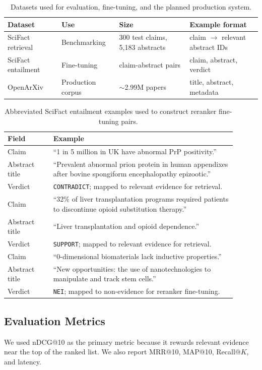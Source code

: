 \documentclass[11pt,a4paper]{article}
\begin{document}
\begin{table}[H]
\centering
\small
\begin{tabular}{llll}
\toprule
Dataset & Use & Size & Example format \\
\midrule
SciFact retrieval & Benchmarking & 300 test claims, 5,183 abstracts & claim $\rightarrow$ relevant abstract IDs \\
SciFact entailment & Fine-tuning & claim-abstract pairs & claim, abstract, verdict \\
OpenArXiv & Production corpus & $\sim$2.99M papers & title, abstract, metadata \\
\bottomrule
\end{tabular}
\caption{Datasets used for evaluation, fine-tuning, and the planned production system.}
\label{tab:datasets}
\end{table}

\begin{table}[H]
\centering
\small
\begin{tabular}{p{0.18\linewidth}p{0.72\linewidth}}
\toprule
Field & Example \\
\midrule
Claim & ``1 in 5 million in UK have abnormal PrP positivity.'' \\
Abstract title & ``Prevalent abnormal prion protein in human appendixes after bovine spongiform encephalopathy epizootic.'' \\
Verdict & \texttt{CONTRADICT}; mapped to relevant evidence for retrieval. \\
\midrule
Claim & ``32\% of liver transplantation programs required patients to discontinue opioid substitution therapy.'' \\
Abstract title & ``Liver transplantation and opioid dependence.'' \\
Verdict & \texttt{SUPPORT}; mapped to relevant evidence for retrieval. \\
\midrule
Claim & ``0-dimensional biomaterials lack inductive properties.'' \\
Abstract title & ``New opportunities: the use of nanotechnologies to manipulate and track stem cells.'' \\
Verdict & \texttt{NEI}; mapped to non-evidence for reranker fine-tuning. \\
\bottomrule
\end{tabular}
\caption{Abbreviated SciFact entailment examples used to construct reranker fine-tuning pairs.}
\label{tab:sample-format}
\end{table}

\subsection{Evaluation Metrics}
We used nDCG@10 as the primary metric because it rewards relevant evidence near the top of the ranked list. We also report MRR@10, MAP@10, Recall@$K$, and latency.
\end{document}
